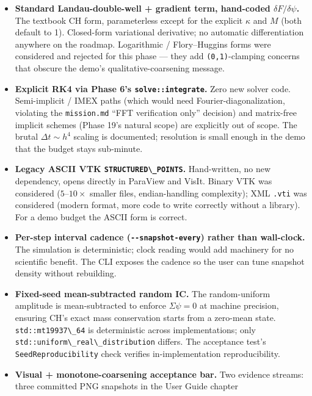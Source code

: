 \begin{itemize}
\item
  \textbf{Standard Landau-double-well + gradient term, hand-coded
  \(\delta F/\delta\psi\).} The textbook CH form, parameterless
  except for the explicit \(\kappa\) and \(M\) (both default to 1).
  Closed-form variational derivative; no automatic differentiation
  anywhere on the roadmap. Logarithmic / Flory--Huggins forms were
  considered and rejected for this phase --- they add
  \passthrough{\lstinline!(0,1)!}-clamping concerns that obscure the
  demo's qualitative-coarsening message.
\item
  \textbf{Explicit RK4 via Phase 6's
  \passthrough{\lstinline!solve::integrate!}.} Zero new solver code.
  Semi-implicit / IMEX paths (which would need
  Fourier-diagonalization, violating the
  \passthrough{\lstinline!mission.md!} ``FFT verification only''
  decision) and matrix-free implicit schemes (Phase 19's natural
  scope) are explicitly out of scope. The brutal
  \(\Delta t \sim h^4\) scaling is documented; resolution is small
  enough in the demo that the budget stays sub-minute.
\item
  \textbf{Legacy ASCII VTK \passthrough{\lstinline!STRUCTURED\_POINTS!}.}
  Hand-written, no new dependency, opens directly in ParaView and
  VisIt. Binary VTK was considered (\(5\)--\(10\times\) smaller files,
  endian-handling complexity); XML \passthrough{\lstinline!.vti!} was
  considered (modern format, more code to write correctly without a
  library). For a demo budget the ASCII form is correct.
\item
  \textbf{Per-step interval cadence (\passthrough{\lstinline!--snapshot-every!})
  rather than wall-clock.} The simulation is deterministic; clock
  reading would add machinery for no scientific benefit. The CLI
  exposes the cadence so the user can tune snapshot density without
  rebuilding.
\item
  \textbf{Fixed-seed mean-subtracted random IC.} The random-uniform
  amplitude is mean-subtracted to enforce \(\Sigma\psi=0\) at machine
  precision, ensuring CH's exact mass conservation starts from a
  zero-mean state. \passthrough{\lstinline!std::mt19937\_64!} is
  deterministic across implementations; only
  \passthrough{\lstinline!std::uniform\_real\_distribution!} differs.
  The acceptance test's
  \passthrough{\lstinline!SeedReproducibility!} check verifies
  in-implementation reproducibility.
\item
  \textbf{Visual + monotone-coarsening acceptance bar.} Two evidence
  streams: three committed PNG snapshots in the User Guide chapter

\end{itemize}
